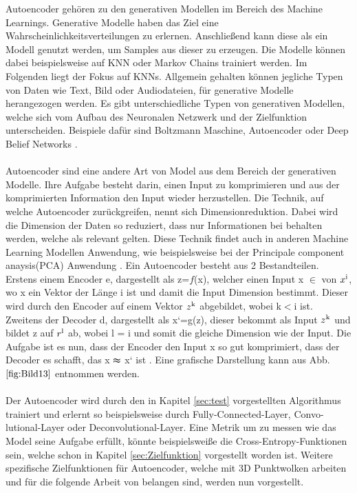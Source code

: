 \documentclass{llncs}
\begin{document}
Autoencoder gehören zu den generativen Modellen im Bereich des Machine Learnings. Generative Modelle haben das Ziel eine Wahrscheinlichkeitsverteilungen zu erlernen. Anschließend kann diese als ein Modell genutzt werden, um Samples aus dieser zu erzeugen. Die Modelle können dabei beispielsweise auf KNN oder Markov Chains trainiert werden. Im Folgenden liegt der Fokus auf KNNs. Allgemein gehalten können jegliche Typen von Daten wie Text, Bild oder Audiodateien, für generative Modelle herangezogen werden. Es gibt unterschiedliche Typen von generativen Modellen, welche sich vom Aufbau des Neuronalen Netzwerk und der Zielfunktion unterscheiden. Beispiele dafür sind Boltzmann Maschine, Autoencoder oder Deep Belief Networks \cite{Grundlagen}. 
\\\\
Autoencoder sind eine andere Art von Model aus dem Bereich der generativen Modelle. Ihre Aufgabe besteht darin, einen Input zu komprimieren und aus der komprimierten Information den Input wieder herzustellen. Die Technik, auf welche Autoencoder zurückgreifen, nennt sich Dimensionreduktion. Dabei wird die Dimension der Daten so reduziert, dass nur Informationen bei behalten werden, welche als relevant gelten. Diese Technik findet auch in anderen Machine Learning Modellen Anwendung, wie beispielsweise bei der Principale component anaysis(PCA) Anwendung \cite{dimreduction}.  Ein Autoencoder besteht aus 2 Bestandteilen. Erstens einem Encoder e, dargestellt als z=$f$(x), welcher einen Input x $\in$ von $x\textsuperscript{i}$, wo x ein Vektor der Länge i ist und damit die Input Dimension bestimmt. Dieser wird durch den Encoder auf einem Vektor $z\textsuperscript{k}$ abgebildet, wobei k$<$i ist. Zweitens der Decoder d, dargestellt als x`=g(z), dieser bekommt als Input $z\textsuperscript{k}$ und bildet z auf $r\textsuperscript{l}$ ab, wobei l = i und somit die gleiche Dimension wie der Input. Die Aufgabe ist es nun, dass der Encoder den Input x so gut komprimiert, dass der Decoder es schafft, das x $\thickapprox$ x` ist \cite{Grundlagen}. Eine grafische Darstellung kann aus Abb. $\ref{fig:Bild13}$ entnommen werden. 
\\\\
Der Autoencoder wird durch den in Kapitel \ref{sec:test} vorgestellten Algorithmus trainiert und erlernt so beispielsweise durch Fully-Connected-Layer,  Convo-lutional-Layer oder Deconvolutional-Layer. Eine Metrik um zu messen wie das Model seine Aufgabe erfüllt, könnte beispielsweiße die Cross-Entropy-Funktionen sein, welche schon in Kapitel \ref{sec:Zielfunktion} vorgestellt worden ist. Weitere spezifische Zielfunktionen für Autoencoder, welche mit 3D Punktwolken arbeiten und für die folgende Arbeit von belangen sind, werden nun vorgestellt.
\end{document}
